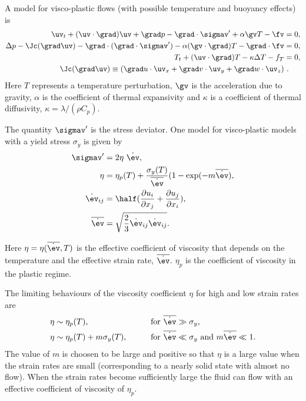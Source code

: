 
A model for visco-plastic flows (with possible temperature and buoyancy effects) is
\begin{align}
  \uv_t + (\uv\cdot\grad)\uv + \grad p - \grad\cdot \sigmav' +\alpha \gv T  -\fv &=0 , \label{eq:vpu} \\
  \Delta p - \Jc(\grad\uv) -\grad\cdot(\grad\cdot \sigmav') 
                -\alpha (\gv\cdot\grad) T - \grad\cdot\fv &=0, \label{eq:vpp} \\
  T_t + (\uv\cdot\grad) T - \kappa \Delta T - f_T &=0 , \\
  \Jc(\grad\uv) \equiv (\grad u\cdot\uv_x + \grad v\cdot\uv_y + \grad w\cdot \uv_z) &~.
\end{align}
Here $T$ represents a temperature perturbation, $\gv$ is the acceleration due to gravity,
$\alpha$ is the coefficient of thermal expansivity and $\kappa$ is a coefficient of
thermal diffusivity, $\kappa=\lambda/(\rho C_p)$. 

\newcommand{\esr}{\overline{ {\dot \ev} }}

The quantity $\sigmav'$ is the stress deviator. One model for visco-plastic models with
a yield stress $\sigma_y$ is given by
\begin{align}
   \sigmav' &= 2 \eta~ {\dot \ev}, \\
   \eta &=  \eta_p(T) + {\sigma_y(T) \over \esr }( 1 - \exp(-m\esr) , \label{VP:etaModel} \\
    {\dot \ev}_{ij} &= \half( {\partial u_i\over\partial x_j} + {\partial u_j\over\partial x_i}), \\
    \esr &= \sqrt{ {2\over 3} {\dot \ev}_{ij}{\dot \ev}_{ij} } . 
\end{align}


Here $\eta=\eta(\esr,T)$ is the effective coefficient of viscosity that depends on
the temperature and the effective strain rate, $\esr$. $\eta_p$ is the coefficient
of viscosity in the plastic regime. 


The limiting behaviours of the viscosity coefficient $\eta$ for high and low strain rates are
\begin{alignat*}{3}
\eta &\sim  \eta_p(T), &\qquad& \text{for $\esr \gg \sigma_y$}, \\
\eta &\sim  \eta_p(T) + m \sigma_y(T) , &\qquad& \text{for $\esr \ll \sigma_y$ and $m\esr \ll 1$} . 
\end{alignat*}
The value of $m$ is choosen to be large and positive  %
so that $\eta$ is a large value when the strain rates are small (corresponding to a nearly solid state
with almost no flow).
When the strain rates become sufficiently large the fluid can flow with an effective
coefficient of viscosity of $\eta_p$. 

